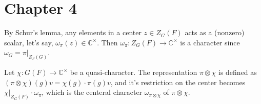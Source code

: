 \newpage
\section{Chapter 4}

\begin{problem} \notfinish
\end{problem}

\begin{problem} \notfinish
\end{problem}

\begin{problem} \notfinish


    
\end{problem}

\begin{problem} \notfinish
\end{problem}

\begin{problem}
By Schur's lemma, any elements in a center $z\in Z_G(F)$ acts as a (nonzero) scalar, let's say, $\omega_\pi(z) \in \mathbb{C}^{\times}$.
Then $\omega_\pi: Z_G(F) \to \mathbb{C}^{\times}$ is a character since $\omega_G = \pi|_{Z_F(G)}$.

Let $\chi: G(F) \to \mathbb{C}^{\times}$ be a quasi-character.
The representation $\pi \otimes \chi$ is defined as $(\pi \otimes \chi)(g)v = \chi(g)\cdot \pi(g)v$,
and it's restriction on the center becomes $\chi|_{Z_G(F)} \cdot \omega_\pi$, which is the centeral character $\omega_{\pi \otimes \chi}$ of $\pi \otimes \chi$.
\end{problem}

